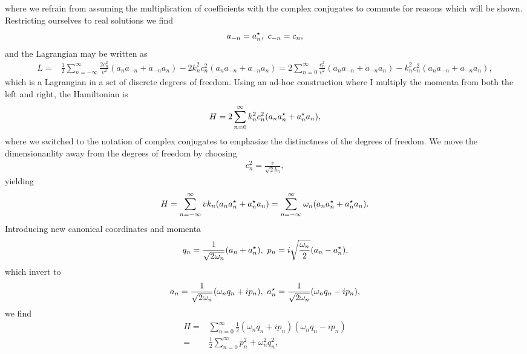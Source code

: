 where we refrain from assuming the multiplication of coefficients with the complex conjugates to commute for reasons which will be shown. Restricting ourselves to real solutions we find
\begin{align*}
	a_{-n} = a_{n}^{\star},\ c_{-n} = c_{n},
\end{align*}
and the Lagrangian may be written as
\begin{align*}
	L =& \frac{1}{2}\sum\limits_{n = -\infty}^{\infty}\frac{2c_{n}^{2}}{v^{2}}(\dot{a}_{n}\dot{a}_{-n} + \dot{a}_{-n}\dot{a}_{n}) - 2k_{n}^{2}c_{n}^{2}(a_{n}a_{-n} + a_{-n}a_{n}) = 2\sum\limits_{n = 0}^{\infty}\frac{c_{n}^{2}}{v^{2}}(\dot{a}_{n}\dot{a}_{-n} + \dot{a}_{-n}\dot{a}_{n}) - k_{n}^{2}c_{n}^{2}(a_{n}a_{-n} + a_{-n}a_{n}),
\end{align*}
which is a Lagrangian in a set of discrete degrees of freedom. Using an ad-hoc construction where I multiply the momenta from both the left and right, the Hamiltonian is
\begin{align*}
	H = 2\sum\limits_{n = 0}^{\infty}k_{n}^{2}c_{n}^{2}(a_{n}a_{n}^{\star} + a_{n}^{\star} a_{n}),
\end{align*}
where we switched to the notation of complex conjugates to emphasize the distinctness of the degrees of freedom. We move the dimensionanlity away from the degrees of freedom by choosing
\begin{align*}
	c_{n}^{2} = \frac{v}{\sqrt{2}k_{n}},
\end{align*}
yielding
\begin{align*}
	H = \sum\limits_{n = -\infty}^{\infty}vk_{n}(a_{n}a_{n}^{\star} + a_{n}^{\star} a_{n}) = \sum\limits_{n = -\infty}^{\infty}\omega_{n}(a_{n}a_{n}^{\star} + a_{n}^{\star} a_{n}).
\end{align*}
Introducing new canonical coordinates and momenta
\begin{align*}
	q_{n} = \frac{1}{\sqrt{2\omega_{n}}}(a_{n} + a_{n}^{\star}),\ p_{n} = i\sqrt{\frac{\omega_{n}}{2}}(a_{n} - a_{n}^{\star}),
\end{align*}
which invert to
\begin{align*}
	a_{n} = \frac{1}{\sqrt{2\omega_{n}}}(\omega_{n}q_{n} + ip_{n}),\ a_{n}\cc = \frac{1}{\sqrt{2\omega_{n}}}(\omega_{n}q_{n} - ip_{n}),
\end{align*}
we find
\begin{align*}
	H =& \sum\limits_{n = 0}^{\infty}\frac{1}{2}(\omega_{n}q_{n} + ip_{n})(\omega_{n}q_{n} - ip_{n}) \\ 
	  =& \frac{1}{2}\sum\limits_{n = 0}^{\infty}p_{n}^{2} + \omega_{n}^{2}q_{n}^{2},
\end{align*}
